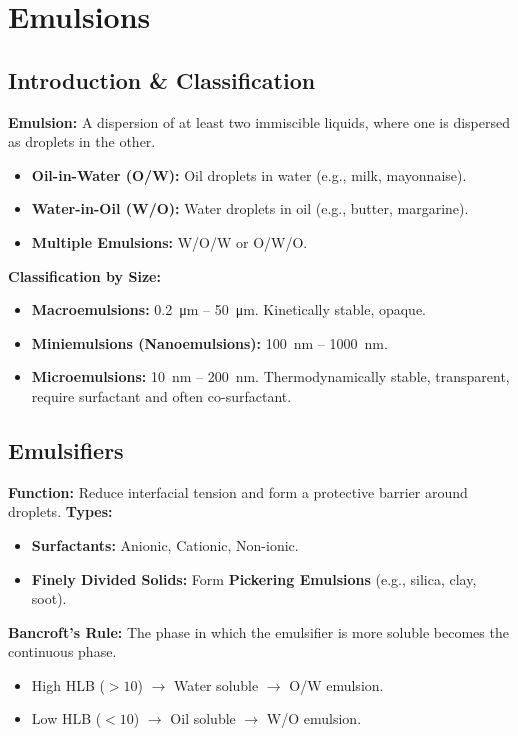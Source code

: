 \section{Emulsions}

\subsection{Introduction \& Classification}
\textbf{Emulsion:} A dispersion of at least two immiscible liquids, where one is dispersed as droplets in the other.
\begin{itemize}
    \item \textbf{Oil-in-Water (O/W):} Oil droplets in water (e.g., milk, mayonnaise).
    \item \textbf{Water-in-Oil (W/O):} Water droplets in oil (e.g., butter, margarine).
    \item \textbf{Multiple Emulsions:} W/O/W or O/W/O.
\end{itemize}

\textbf{Classification by Size:}
\begin{itemize}
    \item \textbf{Macroemulsions:} \SI{0.2}{\micro\m} -- \SI{50}{\micro\m}. Kinetically stable, opaque.
    \item \textbf{Miniemulsions (Nanoemulsions):} \SI{100}{\nm} -- \SI{1000}{\nm}.
    \item \textbf{Microemulsions:} \SI{10}{\nm} -- \SI{200}{\nm}. Thermodynamically stable, transparent, require surfactant and often co-surfactant.
\end{itemize}

\subsection{Emulsifiers}
\textbf{Function:} Reduce interfacial tension and form a protective barrier around droplets.
\textbf{Types:}
\begin{itemize}
    \item \textbf{Surfactants:} Anionic, Cationic, Non-ionic.
    \item \textbf{Finely Divided Solids:} Form \textbf{Pickering Emulsions} (e.g., silica, clay, soot).
\end{itemize}

\textbf{Bancroft's Rule:} The phase in which the emulsifier is more soluble becomes the continuous phase.
\begin{itemize}
    \item High HLB ($> 10$) $\to$ Water soluble $\to$ O/W emulsion.
    \item Low HLB ($< 10$) $\to$ Oil soluble $\to$ W/O emulsion.
\end{itemize}

